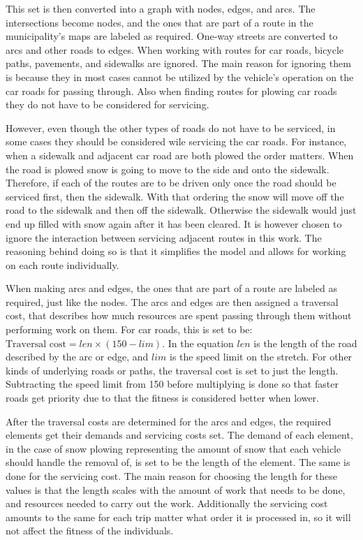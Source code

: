 This set is then converted into a graph with nodes, edges, and arcs. The intersections become nodes, and the ones that are part of a route in the municipality's maps are labeled as required. One-way streets are converted to arcs and other roads to edges. When working with routes for car roads, bicycle paths, pavements, and sidewalks are ignored. The main reason for ignoring them is because they in most cases cannot be utilized by the vehicle's operation on the car roads for passing through. Also when finding routes for plowing car roads they do not have to be considered for servicing.

However, even though the other types of roads do not have to be serviced, in some cases they should be considered wile servicing the car roads. For instance, when a sidewalk and adjacent car road are both plowed the order matters. When the road is plowed snow is going to move to the side and onto the sidewalk. Therefore, if each of the routes are to be driven only once the road should be serviced first, then the sidewalk. With that ordering the snow will move off the road to the sidewalk and then off the sidewalk. Otherwise the sidewalk would just end up filled with snow again after it has been cleared. It is however chosen to ignore the interaction between servicing adjacent routes in this work. The reasoning behind doing so is that it simplifies the model and allows for working on each route individually.

When making arcs and edges, the ones that are part of a route are labeled as required, just like the nodes. The arcs and edges are then assigned a traversal cost, that describes how much resources are spent passing through them without performing work on them. For car roads, this is set to be: $\text{Traversal cost} = len \times (150 - lim)$. In the equation $len$ is the length of the road described by the arc or edge, and $lim$ is the speed limit on the stretch. For other kinds of underlying roads or paths, the traversal cost is set to just the length. Subtracting the speed limit from 150 before multiplying is done so that faster roads get priority due to that the fitness is considered better when lower.

After the traversal costs are determined for the arcs and edges, the required elements get their demands and servicing costs set. The demand of each element, in the case of snow plowing representing the amount of snow that each vehicle should handle the removal of, is set to be the length of the element. The same is done for the servicing cost. The main reason for choosing the length for these values is that the length scales with the amount of work that needs to be done, and resources needed to carry out the work. Additionally the servicing cost amounts to the same for each trip matter what order it is processed in, so it will not affect the fitness of the individuals.

